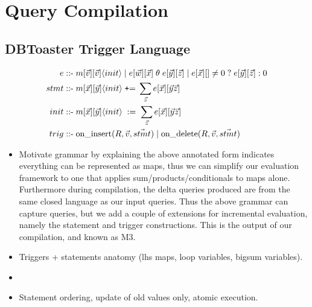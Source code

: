 \section{Query Compilation}

\subsection{DBToaster Trigger Language}

\noindent{}

\noindent{}

\def\mtins{\mbox{on\_insert}}
\def\mtdel{\mbox{on\_delete}}
\begin{align*}
e \; \mbox{::-} & \;
  m[\vec{v}][\vec{v}]\tuple{init}
\comment{
  c \;|\; v \;|\;
  \;|\; e[\vec{w}][\vec{x}] * e[\vec{y}][\vec{z}]
  \;|\; e[\vec{w}][\vec{x}] + e[\vec{y}][\vec{z}]
\\
& 
}
  \;|\; e[\vec{w}][\vec{x}] \;\theta\; e[\vec{y}][\vec{z}]
  \;|\; e[\vec{x}][] \neq 0 \; ? \; e[\vec{y}][\vec{z}] :0
\\
stmt \; \mbox{::-} & \; m[\vec{x}][\vec{y}]\tuple{init}
     \; \mbox{{\tt+}=} \; \sum_{\vec{z}} e[\vec{x}][\vec{y}\vec{z}]\\
init \; \mbox{::-} & \; m[\vec{x}][\vec{y}]\tuple{init}
     \; := \; \sum_{\vec{z}} e[\vec{x}][\vec{y}\vec{z}]\\
trig \; \mbox{::-} & \; \mtins(R,\vec{v},\vec{stmt}) \;|\;
\mtdel(R,\vec{v},\vec{stmt})
\end{align*}

\begin{itemize}
  \item Motivate grammar by explaining the above annotated form indicates
  everything can be represented as maps, thus we can simplify our evaluation
  framework to one that applies sum/products/conditionals to maps alone.
  Furthermore during compilation, the delta queries produced are from the same
  closed language as our input queries. Thus the above grammar can capture
  queries, but we add a couple of extensions for incremental evaluation, namely
  the statement and trigger constructions. This is the output of our
  compilation, and known as M3.
  \item Triggers + statements anatomy (lhs maps, loop variables, bigsum
  variables).
  \item {}
  \item Statement ordering, update of old values only, atomic execution.
\end{itemize}

